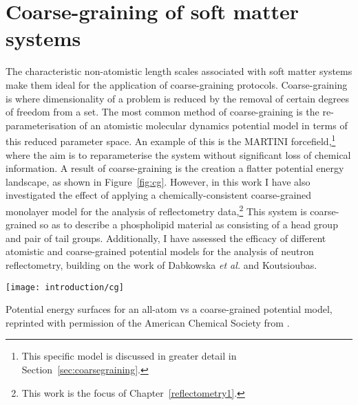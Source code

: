 \section{Coarse-graining of soft matter systems}
The characteristic non-atomistic length scales associated with soft matter systems make them ideal for the application of coarse-graining protocols.
Coarse-graining is where dimensionality of a problem is reduced by the removal of certain degrees of freedom from a set.
The most common method of coarse-graining is the re-parameterisation of an atomistic molecular dynamics potential model in terms of this reduced parameter space.
An example of this is the MARTINI forcefield,\footnote{This specific model is discussed in greater detail in Section~\ref{sec:coarsegraining}.} where the aim is to reparameterise the system without significant loss of chemical information.\autocite{marrink_martini_2007}
A result of coarse-graining is the creation a flatter potential energy landscape, as shown in Figure~\ref{fig:cg}.
However, in this work I have also investigated the effect of applying a chemically-consistent coarse-grained monolayer model for the analysis of reflectometry data,\footnote{This work is the focus of Chapter~\ref{reflectometry1}.}
This system is coarse-grained so as to describe a phospholipid material as consisting of a head group and pair of tail groups.
Additionally, I have assessed the efficacy of different atomistic and coarse-grained potential models for the analysis of neutron reflectometry, building on the work of Dabkowska \emph{et al.} and Koutsioubas.\autocite[][see Chapter~\ref{reflectometry2}]{dabkowska_modulation_2014,koutsioubas_combined_2016}
%
\begin{marginfigure}
    \texttt{[image: introduction/cg]}
    \caption{Potential energy surfaces for an all-atom vs a coarse-grained potential model, reprinted with permission of the American Chemical Society from \cite{kmiecik_coarse-grained_2016}.}
    \label{fig:cg}
\end{marginfigure}
%
